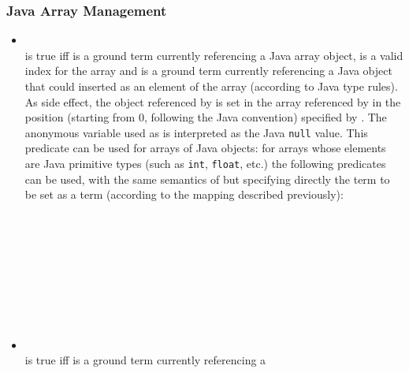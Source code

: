 \subsubsection{Java Array Management}
\begin{itemize}
%
\item {}\\
\noindent{} is true iff
 is a ground term currently referencing a Java
array object,  is a valid index for the array and
 is a ground term currently referencing a Java object
that could inserted as an element of the array (according to Java
type rules).
%
As side effect, the object referenced by  is set in the
array referenced by  in the position (starting from
0, following the Java convention) specified by .
%
The anonymous variable used as  is interpreted as the
Java \texttt{null} value.
%
This predicate can be used for arrays of Java objects:
%
for arrays whose elements are Java primitive types (such as
\texttt{int}, \texttt{float}, etc.) the following predicates can
be used, with the same semantics of  but
specifying directly the term to be set as a \tuprolog{} term
(according to the mapping described previously):\\
%
\mbox{~~~~}\\
\mbox{~~~~}\\
\mbox{~~~~}\\
\mbox{~~~~}\\
\mbox{~~~~}\\
\mbox{~~~~}\\
\mbox{~~~~}\\
\mbox{~~~~}\\
%
%
%
%
\item {}\\
\noindent{} is
true iff  is a ground term currently referencing a

\end{itemize}
